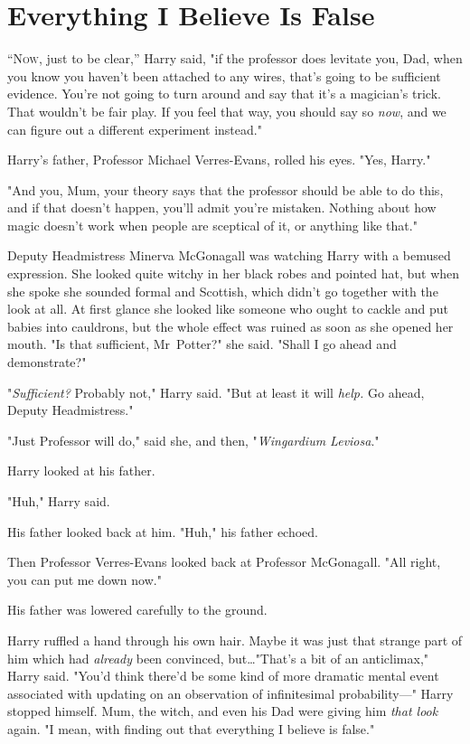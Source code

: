 \chapter{Everything I Believe Is False}

\lettrine{“N}{ow}, just to be clear,” Harry said, "if the professor does levitate you, Dad,
when you know you haven't been attached to any wires, that's going to be
sufficient evidence. You're not going to turn around and say that it's a
magician's trick. That wouldn't be fair play. If you feel that way, you should
say so \emph{now}, and we can figure out a different experiment instead."

Harry's father, Professor Michael Verres-Evans, rolled his eyes. "Yes, Harry."

"And you, Mum, your theory says that the professor should be able to do this,
and if that doesn't happen, you'll admit you're mistaken. Nothing about how
magic doesn't work when people are sceptical of it, or anything like that."

Deputy Headmistress Minerva McGonagall was watching Harry with a bemused
expression. She looked quite witchy in her black robes and pointed hat, but
when she spoke she sounded formal and Scottish, which didn't go together with
the look at all. At first glance she looked like someone who ought to cackle
and put babies into cauldrons, but the whole effect was ruined as soon as she
opened her mouth. "Is that sufficient, Mr~Potter?" she said. "Shall I go ahead
and demonstrate?"

"\emph{Sufficient?} Probably not," Harry said. "But at least it will
\emph{help.} Go ahead, Deputy Headmistress."

"Just Professor will do," said she, and then, "\emph{Wingardium Leviosa}."

Harry looked at his father.

"Huh," Harry said.

His father looked back at him. "Huh," his father echoed.

Then Professor Verres-Evans looked back at Professor McGonagall. "All right,
you can put me down now."

His father was lowered carefully to the ground.

Harry ruffled a hand through his own hair. Maybe it was just that strange part
of him which had \emph{already} been convinced, but…"That's a bit of an
anticlimax," Harry said. "You'd think there'd be some kind of more dramatic
mental event associated with updating on an observation of infinitesimal
probability---" Harry stopped himself. Mum, the witch, and even his Dad were
giving him \emph{that look} again. "I mean, with finding out that everything I
believe is false."


